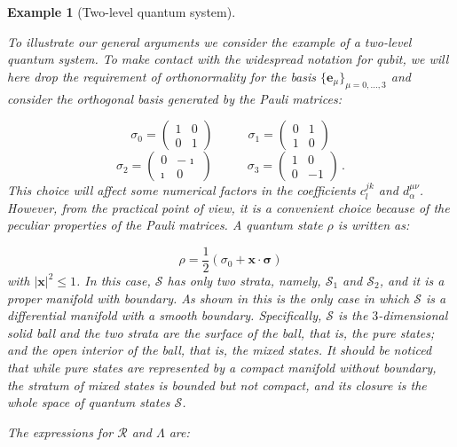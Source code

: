 \documentclass[11pt]{article}
\newcommand{\be}{\begin{equation}}
\newcommand{\ee}{\end{equation}}
\newcommand{\stsp}{\mathcal{S}}
\newtheorem{exmp}{Example}
\begin{document}
\begin{exmp}[Two-level quantum system]\label{example: two level quantum system geometry}

To illustrate our general arguments we consider the example of a two-level quantum system.
To make contact with the widespread notation for qubit, we will here drop the requirement of orthonormality for the basis $\{\mathbf{e}_{\mu}\}_{\mu=0,...,3}$ and consider the orthogonal basis generated by the Pauli  matrices:

\be
\sigma_{0}=\left(\begin{array}{cc} 1 & 0 \\ 0 & 1 \end{array}\right) \;\;\;\;\;\;\;\;\;\; \sigma_{1}=\left(\begin{array}{cc} 0 & 1 \\ 1 & 0 \end{array}\right)
\ee 
\be
\sigma_{2}=\left(\begin{array}{cc} 0 & -\imath \\ \imath & 0 \end{array}\right) \;\;\;\;\;\;\;\;\;\; \sigma_{3}=\left(\begin{array}{cc} 1 & 0 \\ 0 & -1 \end{array}\right)\,.
\ee
This choice will affect some numerical factors in the coefficients $c^{jk}_{l}$ and $d^{\mu\nu}_{\alpha}$.
However, from the practical point of view, it is a convenient choice because of the peculiar properties of the Pauli matrices.
A quantum state $\rho$ is written as:

\be
\rho=\frac{1}{2}\left(\sigma_{0} + \mathbf{x}\cdot\boldsymbol{\sigma}\right) 
\ee
with $|\mathbf{x}|^{2}\leq 1$.
In this case, $\stsp$ has only two strata, namely, $\stsp_{1}$ and $\stsp_{2}$, and it is a proper manifold with boundary.
As shown in \cite{grabowski_kus_marmo-geometry_of_quantum_systems_density_states_and_entanglement} this is the only case in which $\stsp$ is a differential manifold with a smooth boundary.
Specifically, $\stsp$ is the $3$-dimensional solid ball and the two strata are the surface of the ball, that is, the pure states; and the open interior of the ball, that is, the mixed states.
It should be noticed that while pure states are represented by a compact manifold without boundary, the stratum of mixed states is bounded but not compact, and its closure is the whole space of quantum states $\stsp$.

The expressions for $\mathcal{R}$ and $\Lambda$ are:


\end{exmp}
\end{document}
